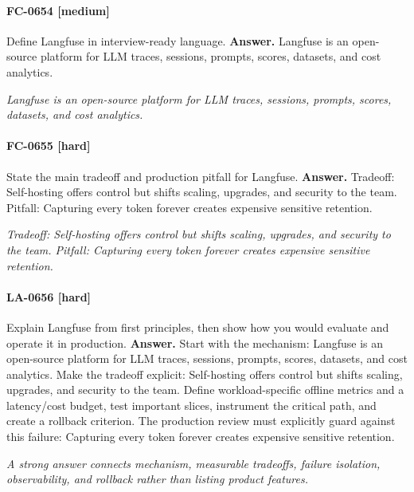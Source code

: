 \paragraph{FC-0654 [medium]} Define Langfuse in interview-ready language.
\noindent\textbf{Answer.} Langfuse is an open-source platform for LLM traces, sessions, prompts, scores, datasets, and cost analytics.
\par\textit{Langfuse is an open-source platform for LLM traces, sessions, prompts, scores, datasets, and cost analytics.}
\paragraph{FC-0655 [hard]} State the main tradeoff and production pitfall for Langfuse.
\noindent\textbf{Answer.} Tradeoff: Self-hosting offers control but shifts scaling, upgrades, and security to the team. Pitfall: Capturing every token forever creates expensive sensitive retention.
\par\textit{Tradeoff: Self-hosting offers control but shifts scaling, upgrades, and security to the team. Pitfall: Capturing every token forever creates expensive sensitive retention.}
\paragraph{LA-0656 [hard]} Explain Langfuse from first principles, then show how you would evaluate and operate it in production.
\noindent\textbf{Answer.} Start with the mechanism: Langfuse is an open-source platform for LLM traces, sessions, prompts, scores, datasets, and cost analytics. Make the tradeoff explicit: Self-hosting offers control but shifts scaling, upgrades, and security to the team. Define workload-specific offline metrics and a latency/cost budget, test important slices, instrument the critical path, and create a rollback criterion. The production review must explicitly guard against this failure: Capturing every token forever creates expensive sensitive retention.
\par\textit{A strong answer connects mechanism, measurable tradeoffs, failure isolation, observability, and rollback rather than listing product features.}
